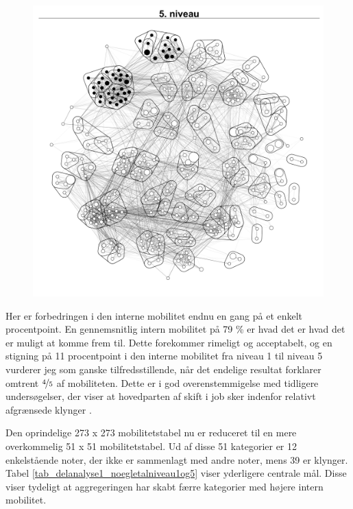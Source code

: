 \begin{figure}[H]
\begin{centering}
  \includegraphics[width=10 cm]{fig/netvaerkskort/kort_seg_proces5.pdf}
  \label{fig_delanalyse1_kort_seg_proces5}
  \caption{}
\end{centering}
\end{figure}

Her er forbedringen i den interne mobilitet endnu en gang på et enkelt procentpoint. En gennemsnitlig intern mobilitet på 79 \% er hvad det er hvad det er muligt at komme frem til. Dette forekommer rimeligt og acceptabelt, og en stigning på 11 procentpoint i den interne mobilitet fra niveau 1 til niveau 5 vurderer jeg som ganske tilfredsstillende, når det endelige resultat forklarer omtrent $\nicefrac{4}{5}$ af mobiliteten. Dette er i god overenstemmigelse med tidligere undersøgelser, der viser at hovedparten af skift i job sker indenfor relativt afgrænsede klynger \parencite[124]{BojeToft1989}. 

Den oprindelige 273 x 273 mobilitetstabel nu er reduceret til en mere overkommelig 51 x 51 mobilitetstabel. Ud af disse 51 kategorier er 12 enkelstående noter, der ikke er sammenlagt med andre noter, mens 39 er klynger. Tabel \ref{tab_delanalyse1_noegletalniveau1og5} viser yderligere centrale mål. Disse viser tydeligt at aggregeringen har skabt færre kategorier med højere intern mobilitet.



